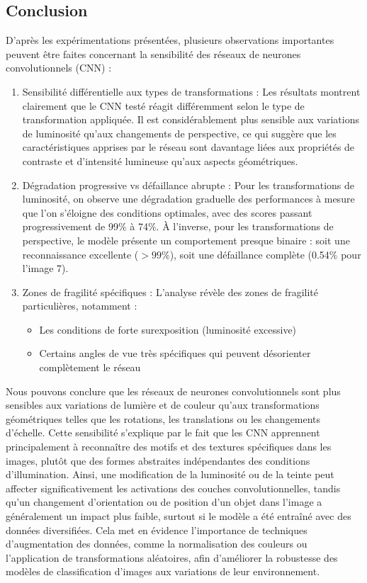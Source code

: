 \subsection{Conclusion}

D'après les expérimentations présentées, plusieurs observations importantes peuvent être faites concernant la sensibilité des réseaux de neurones convolutionnels (CNN) :

\begin{enumerate}
    \item Sensibilité différentielle aux types de transformations : Les résultats montrent clairement que le CNN testé réagit différemment selon le type de transformation appliquée. Il est considérablement plus sensible aux variations de luminosité qu'aux changements de perspective, ce qui suggère que les caractéristiques apprises par le réseau sont davantage liées aux propriétés de contraste et d'intensité lumineuse qu'aux aspects géométriques.
    \item Dégradation progressive vs défaillance abrupte : Pour les transformations de luminosité, on observe une dégradation graduelle des performances à mesure que l'on s'éloigne des conditions optimales, avec des scores passant progressivement de 99\% à 74\%. À l'inverse, pour les transformations de perspective, le modèle présente un comportement presque binaire : soit une reconnaissance excellente ($>99\%$), soit une défaillance complète (0.54\% pour l'image 7).
    \item Zones de fragilité spécifiques : L'analyse révèle des zones de fragilité particulières, notamment :
    \begin{itemize}
        \item Les conditions de forte surexposition (luminosité excessive)
        \item Certains angles de vue très spécifiques qui peuvent désorienter complètement le réseau
    \end{itemize}
\end{enumerate}

Nous pouvons conclure que les réseaux de neurones convolutionnels sont plus sensibles aux variations de lumière et de couleur qu'aux transformations géométriques telles que les rotations, les translations ou les changements d’échelle. Cette sensibilité s’explique par le fait que les CNN apprennent principalement à reconnaître des motifs et des textures spécifiques dans les images, plutôt que des formes abstraites indépendantes des conditions d’illumination. Ainsi, une modification de la luminosité ou de la teinte peut affecter significativement les activations des couches convolutionnelles, tandis qu’un changement d’orientation ou de position d’un objet dans l’image a généralement un impact plus faible, surtout si le modèle a été entraîné avec des données diversifiées. Cela met en évidence l'importance de techniques d'augmentation des données, comme la normalisation des couleurs ou l’application de transformations aléatoires, afin d’améliorer la robustesse des modèles de classification d’images aux variations de leur environnement.
